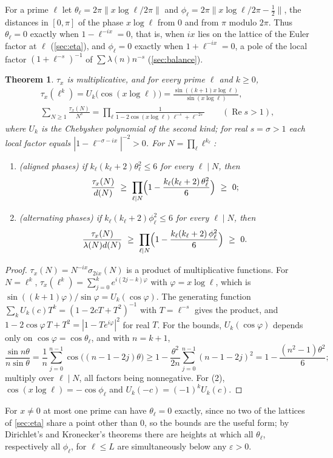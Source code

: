 \documentclass[11pt]{article}
\newtheorem{theorem}{Theorem}[section]
\theoremstyle{definition}\newtheorem{definition}[theorem]{Definition}
\theoremstyle{remark}\newtheorem{remark}[theorem]{Remark}
\renewcommand{\Re}{\operatorname{Re}}\renewcommand{\Im}{\operatorname{Im}}
\begin{document}
For a prime $\ell$ let $\theta_\ell=2\pi\|x\log\ell/2\pi\|$ and $\phi_\ell=2\pi\|x\log\ell/2\pi-\frac12\|$, the distances in $[0,\pi]$ of the phase $x\log\ell$ from $0$ and from $\pi$ modulo $2\pi$. Thus $\theta_\ell=0$ exactly when $1-\ell^{-ix}=0$, that is, when $ix$ lies on the lattice of the Euler factor at $\ell$ (\cref{sec:eta}), and $\phi_\ell=0$ exactly when $1+\ell^{-ix}=0$, a pole of the local factor $(1+\ell^{-s})^{-1}$ of $\sum\lambda(n)n^{-s}$ (\cref{sec:balance}).

\begin{theorem}\label{thm:euler}
$\tau_x$ is multiplicative, and for every prime $\ell$ and $k\ge0$,
\begin{gather*}
\tau_x(\ell^k)=U_k\bigl(\cos(x\log\ell)\bigr)=\frac{\sin((k+1)x\log\ell)}{\sin(x\log\ell)},\\
\sum_{N\ge1}\frac{\tau_x(N)}{N^s}=\prod_\ell\frac1{1-2\cos(x\log\ell)\,\ell^{-s}+\ell^{-2s}}\qquad(\Re s>1),
\end{gather*}
where $U_k$ is the Chebyshev polynomial of the second kind; for real $s=\sigma>1$ each local factor equals $|1-\ell^{-\sigma-ix}|^{-2}>0$. For $N=\prod_\ell\ell^{k_\ell}$:
\begin{enumerate}
\item (aligned phases) if $k_\ell(k_\ell+2)\theta_\ell^2\le6$ for every $\ell\mid N$, then
\[
\frac{\tau_x(N)}{d(N)}\ \ge\ \prod_{\ell\mid N}\Bigl(1-\frac{k_\ell(k_\ell+2)\,\theta_\ell^2}6\Bigr)\ \ge\ 0;
\]
\item (alternating phases) if $k_\ell(k_\ell+2)\phi_\ell^2\le6$ for every $\ell\mid N$, then
\[
\frac{\tau_x(N)}{\lambda(N)d(N)}\ \ge\ \prod_{\ell\mid N}\Bigl(1-\frac{k_\ell(k_\ell+2)\,\phi_\ell^2}6\Bigr)\ \ge\ 0.
\]
\end{enumerate}
\end{theorem}
\begin{proof}
$\tau_x(N)=N^{-ix}\sigma_{2ix}(N)$ is a product of multiplicative functions. For $N=\ell^k$, $\tau_x(\ell^k)=\sum_{j=0}^ke^{i(2j-k)\varphi}$ with $\varphi=x\log\ell$, which is $\sin((k+1)\varphi)/\sin\varphi=U_k(\cos\varphi)$. The generating function $\sum_kU_k(c)T^k=(1-2cT+T^2)^{-1}$ with $T=\ell^{-s}$ gives the product, and $1-2\cos\varphi\,T+T^2=|1-Te^{i\varphi}|^2$ for real $T$. For the bounds, $U_k(\cos\varphi)$ depends only on $\cos\varphi=\cos\theta_\ell$, and with $n=k+1$,
\[
\frac{\sin n\theta}{n\sin\theta}=\frac1n\sum_{j=0}^{n-1}\cos\bigl((n-1-2j)\theta\bigr)\ge1-\frac{\theta^2}{2n}\sum_{j=0}^{n-1}(n-1-2j)^2=1-\frac{(n^2-1)\theta^2}6 ;
\]
multiply over $\ell\mid N$, all factors being nonnegative. For (2), $\cos(x\log\ell)=-\cos\phi_\ell$ and $U_k(-c)=(-1)^kU_k(c)$.
\end{proof}
For $x\ne0$ at most one prime can have $\theta_\ell=0$ exactly, since no two of the lattices of \cref{sec:eta} share a point other than $0$, so the bounds are the useful form; by Dirichlet's and Kronecker's theorems there are heights at which all $\theta_\ell$, respectively all $\phi_\ell$, for $\ell\le L$ are simultaneously below any $\varepsilon>0$.
\end{document}
